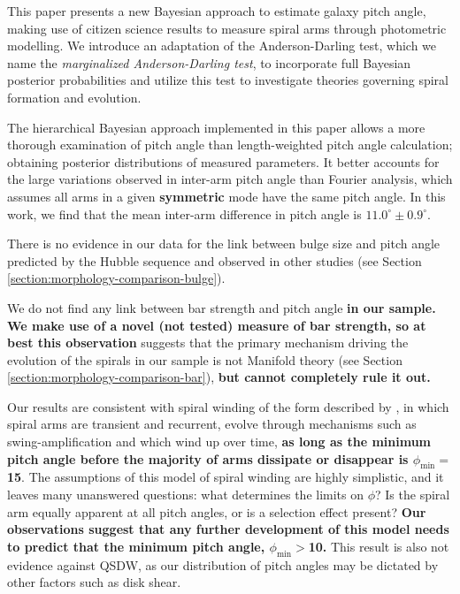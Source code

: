 \label{section:summary}
This paper presents a new Bayesian approach to estimate galaxy pitch angle, making use of citizen science results to measure spiral arms through photometric modelling. We introduce an adaptation of the Anderson-Darling test, which we name the \textit{marginalized Anderson-Darling test}, to incorporate full Bayesian posterior probabilities and utilize this test to investigate theories governing spiral formation and evolution.

The hierarchical Bayesian approach implemented in this paper allows a more thorough examination of pitch angle than length-weighted pitch angle calculation; obtaining posterior distributions of measured parameters. It better accounts for the large variations observed in inter-arm pitch angle than Fourier analysis, which assumes all arms in a given \textbf{symmetric} mode have the same pitch angle. In this work, we find that the mean inter-arm difference in pitch angle is $11.0^\circ\pm 0.9^\circ$.

There is no evidence in our data for the link between bulge size and pitch angle predicted by the Hubble sequence and observed in other studies (see Section \ref{section:morphology-comparison-bulge}).

We do not find any link between bar strength and pitch angle \textbf{in our sample. We make use of a novel (not tested) measure of bar strength, so at best this observation} suggests that the primary mechanism driving the evolution of the spirals in our sample is not Manifold theory (see Section \ref{section:morphology-comparison-bar}), \textbf{but cannot completely rule it out.}

Our results are consistent with spiral winding of the form described by \citet{2019arXiv190910291P}, in which spiral arms are transient and recurrent, evolve through mechanisms such as swing-amplification \citep{1965MNRAS.130..125G} and which wind up over time, \textbf{as long as the minimum pitch angle before the majority of arms dissipate or disappear is $\phi_\mathrm{min} = $ {15\degree}}. The assumptions of this model of spiral winding are highly simplistic, and it leaves many unanswered questions: what determines the limits on $\phi$? Is the spiral arm equally apparent at all pitch angles, or is a selection effect present? \textbf{Our observations suggest that any further development of this model needs to predict that the minimum pitch angle, $\phi_\mathrm{min}>${10\degree}.} This result is also not evidence against QSDW, as our distribution of pitch angles may be dictated by other factors such as disk shear.

